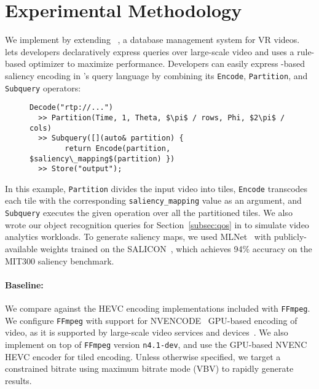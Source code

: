 
\section{Experimental Methodology}
\label{sec:vignette-methodology}

We implement \name by extending \lightdb~\cite{lightdb}, a database management system for VR videos.
\lightdb{} lets developers declaratively express queries over large-scale video and uses a rule-based optimizer to maximize performance.
Developers can easily express \hevc-based saliency encoding in \lightdb's query language by combining its \texttt{Encode}, \texttt{Partition}, and \texttt{Subquery} operators:
\begin{figure}
\begin{lstlisting}[style=VRQL]
Decode("rtp://...")
  >> Partition(Time, 1, Theta, $\pi$ / rows, Phi, $2\pi$ / cols)
  >> Subquery([](auto& partition) {
        return Encode(partition, $saliency\_mapping$(partition) })
  >> Store("output");
\end{lstlisting}
\end{figure}

\noindent In this example, \texttt{Partition} divides the input video into tiles, \texttt{Encode} transcodes each tile with the corresponding \texttt{saliency\_mapping} value as an argument, and  \texttt{Subquery} executes the given operation over all the partitioned tiles.
We also wrote our object recognition queries for Section~\ref{subsec:qos} in \lightdb to simulate video analytics workloads.
To generate saliency maps, we used MLNet~\cite{mlnet2016} with publicly-available weights trained on the SALICON~\cite{huang2015salicon}, which achieves 94\% accuracy on the MIT300 saliency benchmark.

\paragraph{Baseline:} We compare \name against the HEVC encoding implementations included with \texttt{FFmpeg}.
We configure \texttt{FFmpeg} with support for NVENCODE~\cite{nvenc} GPU-based encoding of \hevc video, as it is supported by large-scale video services and devices~\cite{de2016large}.
We also implement \nameCompress on top of \texttt{FFmpeg} version \texttt{n4.1-dev}, and use the GPU-based NVENC HEVC encoder for tiled encoding.
Unless otherwise specified, we target a constrained bitrate using maximum bitrate mode (VBV) to rapidly generate results.

